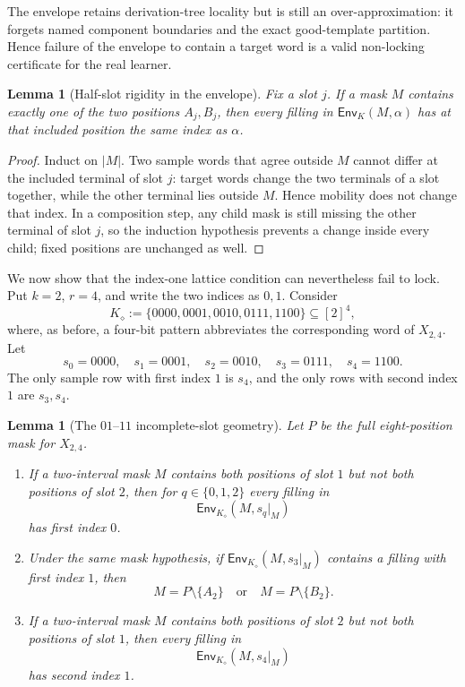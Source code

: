 \documentclass[11pt]{article}
\newtheorem{lemma}[definition]{Lemma}
\newcommand{\Env}{\mathsf{Env}}
\begin{document}
The envelope retains derivation-tree locality but is still an over-approximation:
it forgets named component boundaries and the exact good-template
partition.  Hence failure of the envelope to contain a target word is a valid
non-locking certificate for the real learner.

\begin{lemma}[Half-slot rigidity in the envelope]
\label{lem:half-slot-rigidity}
Fix a slot $j$.  If a mask $M$ contains exactly one of the two positions
$A_j,B_j$, then every filling in $\Env_K(M,\alpha)$ has at that included
position the same index as $\alpha$.
\end{lemma}

\begin{proof}
Induct on $|M|$.  Two sample words that agree outside $M$ cannot differ at the
included terminal of slot $j$: target words change the two terminals of a slot
together, while the other terminal lies outside $M$.  Hence mobility does not
change that index.  In a composition step, any child mask is still missing the
other terminal of slot $j$, so the induction hypothesis prevents a change
inside every child; fixed positions are unchanged as well.
\end{proof}

We now show that the index-one lattice condition can nevertheless fail to
lock.  Put $k=2$, $r=4$, and write the two indices as $0,1$.  Consider
\[
 K_{\diamond}
 :=\{0000,0001,0010,0111,1100\}
 \subseteq[2]^4,
\]
where, as before, a four-bit pattern abbreviates the corresponding word of
$X_{2,4}$.  Let
\[
 s_0=0000,\quad s_1=0001,\quad s_2=0010,
 \quad s_3=0111,\quad s_4=1100.
\]
The only sample row with first index $1$ is $s_4$, and the only rows with
second index $1$ are $s_3,s_4$.

\begin{lemma}[The $01$--$11$ incomplete-slot geometry]
\label{lem:diamond-geometry}
Let $P$ be the full eight-position mask for $X_{2,4}$.
\begin{enumerate}[label=\textup{(\roman*)},leftmargin=*]
\item If a two-interval mask $M$ contains both positions of slot $1$ but not
both positions of slot $2$, then for $q\in\{0,1,2\}$ every filling in
\[
  \Env_{K_{\diamond}}(M,s_q|_M)
\]
has first index $0$.
\item Under the same mask hypothesis, if
\(\Env_{K_{\diamond}}(M,s_3|_M)\) contains a filling with first index $1$, then
\[
   M=P\setminus\{A_2\}
   \quad\text{or}\quad
   M=P\setminus\{B_2\}.
\]
\item If a two-interval mask $M$ contains both positions of slot $2$ but not
both positions of slot $1$, then every filling in
\[
  \Env_{K_{\diamond}}(M,s_4|_M)
\]
has second index $1$.
\end{enumerate}
\end{lemma}
\end{document}
